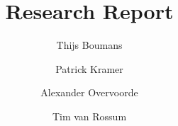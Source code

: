 \documentclass{report}
\title{Research Report}
\author{Thijs Boumans \and Patrick Kramer \and 
        Alexander Overvoorde \and Tim van Rossum}
\begin{document}
\maketitle

\begin{abstract}
\end{abstract}

\tableofcontents






\end{document}

